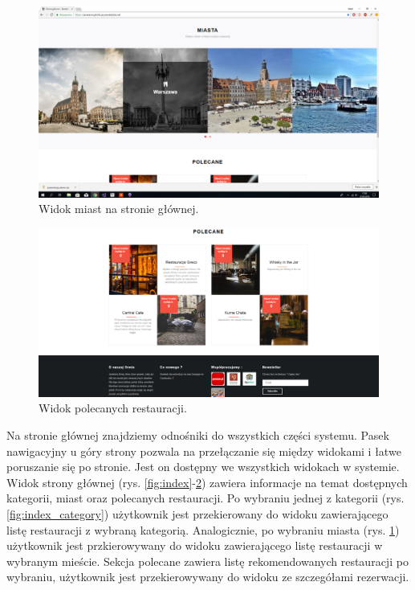 \documentclass{article}
\begin{document}
\begin{figure}[H]
\centering
	\includegraphics[width=1.00\textwidth]{screens/index3.png}
	\caption[caption]{Widok miast na stronie głównej.}
	\label{fig:index_cities}
\end{figure}

\begin{figure}[H]
\centering
	\includegraphics[width=1.00\textwidth]{screens/index4.png}
	\caption[caption]{Widok polecanych restauracji.}
	\label{fig:index_recomended}
\end{figure}

Na stronie głównej znajdziemy odnośniki do wszystkich części systemu. Pasek nawigacyjny u góry strony pozwala na przełączanie się między widokami i łatwe poruszanie się po stronie. Jest on dostępny we wszystkich widokach w systemie. Widok strony głównej (rys. \ref{fig:index}-\ref{fig:index_recomended}) zawiera informacje na temat dostępnych kategorii, miast oraz polecanych restauracji. Po wybraniu jednej z kategorii (rys. \ref{fig:index_category}) użytkownik jest przekierowany do widoku zawierającego listę restauracji z wybraną kategorią. Analogicznie, po wybraniu miasta (rys. \ref{fig:index_cities}) użytkownik jest przkierowywany do widoku zawierającego listę restauracji w wybranym mieście. Sekcja polecane zawiera listę rekomendowanych restauracji po wybraniu, użytkownik jest przekierowywany do widoku ze szczegółami rezerwacji.
\end{document}
